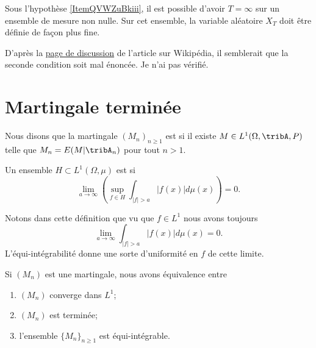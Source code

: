\begin{remark}
    Sous l'hypothèse \ref{ItemQVWZuBkiii}, il est possible d'avoir \( T=\infty\) sur un ensemble de mesure non nulle. Sur cet ensemble, la variable aléatoire \( X_T\) doit être définie de façon plus fine.
\end{remark}

\begin{probleme}
    D'après la \href{https://en.wikipedia.org/wiki/Talk:Optional_stopping_theorem}{page de discussion} de l'article sur Wikipédia, il semblerait que la seconde condition soit mal énoncée. Je n'ai pas vérifié.
\end{probleme}

\section{Martingale terminée}

\begin{definition}
    Nous disons que la martingale \( (M_n)_{n\geq 1}\) est  si il existe \( M\in L^1(\Omega,\tribA,P)\) telle que \( M_n=E(M|\tribA_n)\) pour tout \( n>1\).
\end{definition}

\begin{definition}  \label{DefOZlZnse}
    Un ensemble \( H\subset L^1(\Omega,\mu)\) est  si
    \begin{equation}
        \lim_{a\to \infty}\left( \sup_{f\in H}\int_{  | f |>a   }| f(x) |d\mu(x) \right)=0.
    \end{equation}
\end{definition}
Notons dans cette définition que vu que \( f\in L^1\) nous avons toujours
\begin{equation}
    \lim_{a\to \infty}\int_{| f |>a}| f(x) |d\mu(x)=0.
\end{equation}
L'équi-intégrabilité donne une sorte d'uniformité en \( f\) de cette limite.

\begin{theorem} \label{ThoEFbpVXb}
    Si \( (M_n)\) est une martingale, nous avons équivalence entre
    \begin{enumerate}
        \item
            \( (M_n)\) converge dans \( L^1\);
        \item
            \( (M_n)\) est terminée;
        \item
            l'ensemble \( \{ M_n \}_{n\geq 1}\) est équi-intégrable.
    \end{enumerate}
\end{theorem}

